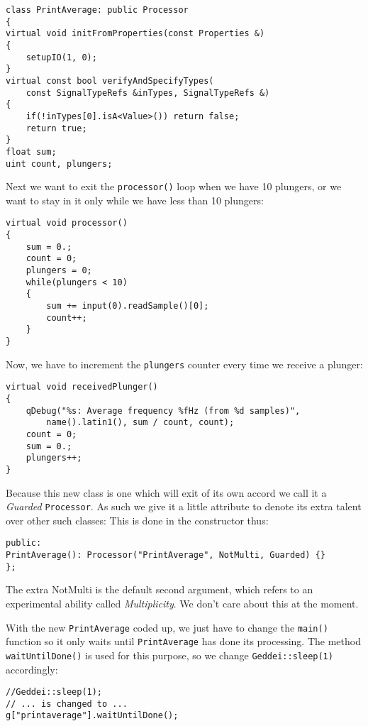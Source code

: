 \begin{verbatim}
class PrintAverage: public Processor
{
virtual void initFromProperties(const Properties &)
{
    setupIO(1, 0);
}
virtual const bool verifyAndSpecifyTypes(
    const SignalTypeRefs &inTypes, SignalTypeRefs &)
{
    if(!inTypes[0].isA<Value>()) return false;
    return true;
}
float sum;
uint count, plungers;
\end{verbatim}

Next we want to exit the \texttt{processor()} loop when we have 10 plungers, or we want to stay in it only while we have less than 10 plungers:

\begin{verbatim}
virtual void processor()
{
    sum = 0.;
    count = 0;
    plungers = 0;
    while(plungers < 10)
    {
        sum += input(0).readSample()[0];
        count++;
    }
}
\end{verbatim}

Now, we have to increment the \texttt{plungers} counter every time we receive a plunger:

\begin{verbatim}
virtual void receivedPlunger()
{
    qDebug("%s: Average frequency %fHz (from %d samples)",
        name().latin1(), sum / count, count);
    count = 0;
    sum = 0.;
    plungers++;
}
\end{verbatim}

Because this new class is one which will exit of its own accord we call it a \textit{Guarded} \texttt{Processor}. As such we give it a little attribute to denote its extra talent over other such classes: This is done in the constructor thus:

\begin{verbatim}
public:
PrintAverage(): Processor("PrintAverage", NotMulti, Guarded) {}
};
\end{verbatim}

The extra NotMulti is the default second argument, which refers to an experimental ability called \textit{Multiplicity}. We don't care about this at the moment.

With the new \texttt{PrintAverage} coded up, we just have to change the \texttt{main()} function so it only waits until \texttt{PrintAverage} has done its processing. The method \texttt{waitUntilDone()} is used for this purpose, so we change \texttt{Geddei::sleep(1)} accordingly:

\begin{verbatim}
//Geddei::sleep(1);
// ... is changed to ...
g["printaverage"].waitUntilDone();
\end{verbatim} 

